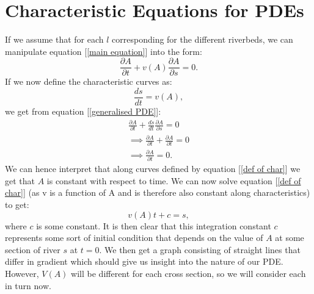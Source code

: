 \documentclass{article}
\begin{document}

\section{Characteristic Equations for PDEs}
If we assume that for each $l$ corresponding for the different riverbeds, we can manipulate equation [\ref{main equation}] into the form: 
\begin{equation}
\label{generalised PDE}
    \frac{\partial A}{\partial t} + v(A) \frac{\partial A}{\partial s} = 0.
\end{equation}
If we now define the characteristic curves as:
\begin{equation}
\label{def of char}
    \frac{ds}{dt} = v(A),
\end{equation}
we get from equation [\ref{generalised PDE}]:
\begin{align}
    \frac{\partial A}{\partial t} + \frac{ds}{dt} \frac{\partial A}{\partial s} = 0\\
    \implies \frac{\partial A}{\partial t} +  \frac{\partial A}{\partial t} = 0 \\
    \implies \frac{\partial A}{\partial t} = 0.
\end{align}
We can hence interpret that along curves defined by equation [\ref{def of char}] we get that $A$ is constant with respect to time. We can now solve equation [\ref{def of char}] (as v is a function of A and is therefore also constant along characteristics) to get: 
\begin{equation}
    \label{solution of char curves}
    v(A)t + c = s,
\end{equation}
where $c$ is some constant. It is then clear that this integration constant $c$ represents some sort of initial condition that depends on the value of $A$ at some section of river $s$ at $t=0$. We then get a graph consisting of straight lines that differ in gradient which should give us insight into the nature of our PDE. However, $V(A)$ will be different for each cross section, so we will consider each in turn now. 
\end{document}
